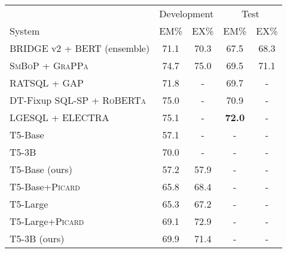 \documentclass[11pt]{article}
\newcommand{\Picard}{\textsc{Picard}}
\begin{document}
\begin{table*}[ht]
\centering
\small
\setlength{\tabcolsep}{6pt}
\begin{tabular}{lcccc}
\toprule
                                                                      & \multicolumn{2}{c}{Development} & \multicolumn{2}{c}{Test}        \\
\cmidrule{2-5}
System                                                                & EM\%           & EX\%           & EM\%           & EX\%           \\
\midrule
BRIDGE v2 + BERT (ensemble) \citep{Lin_2020}                & 71.1           & 70.3           & 67.5           & 68.3           \\
\textsc{SmBoP} + \textsc{GraPPa} \citep{rubin2020smbop}     & 74.7           & 75.0           & 69.5           & 71.1           \\
RATSQL + \textsc{GAP} \citep{shi2021learning}               & 71.8           & -              & 69.7           & -              \\
DT-Fixup SQL-SP + \textsc{RoBERTa} \citep{xu2020optimizing} & 75.0           & -              & 70.9           & -              \\
LGESQL + \textsc{ELECTRA} \citep{cao-etal-2021-lgesql}      & 75.1           & -              & \textbf{72.0}  & -              \\
T5-Base \cite{shaw2020compositional}                                  & 57.1           & -              & -              & -              \\
T5-3B \cite{shaw2020compositional}                                    & 70.0           & -              & -              & -              \\
\midrule
T5-Base (ours)                                                        & 57.2           & 57.9           & -              & -              \\
T5-Base+\Picard{}                                                     & 65.8           & 68.4           & -              & -              \\
T5-Large                                                              & 65.3           & 67.2           & -              & -              \\
T5-Large+\Picard{}                                                    & 69.1           & 72.9           & -              & -              \\
T5-3B (ours)                                                          & 69.9           & 71.4           & -              & -              \\

\end{tabular}
\end{table*}
\end{document}
